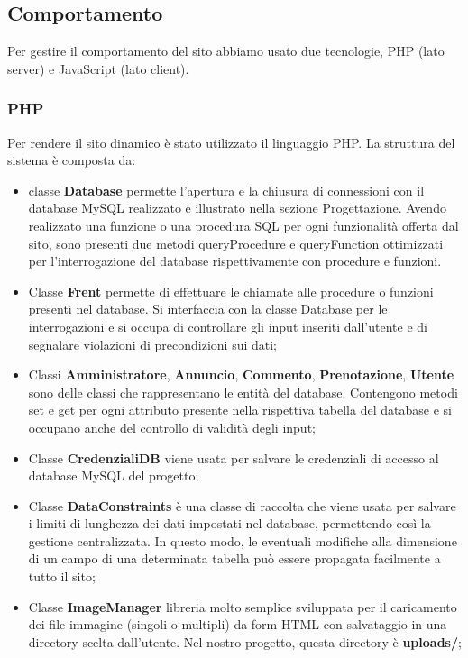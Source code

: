 \documentclass[1_relazione.tex]{subfiles}
\begin{document}
\subsection{Comportamento}
Per gestire il comportamento del sito abbiamo usato due tecnologie, PHP (lato server) e JavaScript (lato client).

\subsubsection{PHP}
Per rendere il sito dinamico \`{e} stato utilizzato il linguaggio PHP.
La struttura del sistema \`{e} composta da:
\begin{itemize}
    \item classe \textbf{Database} permette l'apertura e la chiusura di connessioni con il database MySQL realizzato e illustrato nella sezione Progettazione.
    Avendo realizzato una funzione o una procedura SQL per ogni funzionalit\`{a} offerta dal sito, sono presenti due metodi queryProcedure e queryFunction ottimizzati per l'interrogazione del database rispettivamente con procedure e funzioni.
    \item Classe \textbf{Frent} permette di effettuare le chiamate alle procedure o funzioni presenti nel database. Si interfaccia con la classe Database per le interrogazioni e si occupa di controllare gli input inseriti dall'utente e di segnalare violazioni di precondizioni sui dati;
    \item Classi \textbf{Amministratore}, \textbf{Annuncio}, \textbf{Commento}, \textbf{Prenotazione}, \textbf{Utente} sono delle classi che rappresentano le entit\`{a} del database. Contengono metodi set e get per ogni attributo presente nella rispettiva tabella del database e si occupano anche del controllo di validit\`{a} degli input;
    \item Classe \textbf{CredenzialiDB} viene usata per salvare le credenziali di accesso al database MySQL del progetto;
    \item Classe \textbf{DataConstraints} \`{e} una classe di raccolta che viene usata per salvare i limiti di lunghezza dei dati impostati nel database, permettendo cos\`{i} la gestione centralizzata. In questo modo, le eventuali modifiche alla dimensione di un campo di una determinata tabella pu\`{o} essere propagata facilmente a tutto il sito;
    \item Classe \textbf{ImageManager} libreria molto semplice sviluppata per il caricamento dei file immagine (singoli o multipli) da form HTML con salvataggio in una directory scelta dall'utente. Nel nostro progetto, questa directory è \textbf{uploads/};

\end{itemize}
\end{document}
